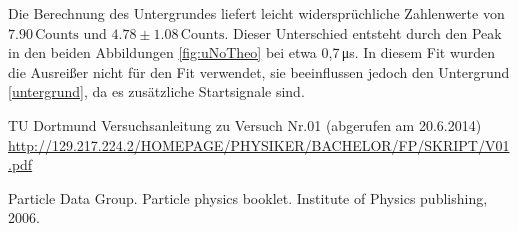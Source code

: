 Die Berechnung des Untergrundes liefert leicht widersprüchliche Zahlenwerte von\\\mbox{$7.90\,\text{Counts}$} und $4.78 \pm 1.08\,\text{Counts}$. Dieser Unterschied entsteht durch den Peak in den beiden Abbildungen \ref{fig:uNoTheo} bei etwa 0,7\,\si{\micro s}. In diesem Fit wurden die Ausreißer nicht für den Fit verwendet, sie beeinflussen jedoch den Untergrund \ref{untergrund}, da es zusätzliche Startsignale sind.

\vfill
\begin{thebibliography}{WissOnl}
 TU Dortmund Versuchsanleitung zu Versuch Nr.01 (abgerufen am 20.6.2014) \url{http://129.217.224.2/HOMEPAGE/PHYSIKER/BACHELOR/FP/SKRIPT/V01.pdf}

 Particle Data Group. Particle physics booklet. Institute of Physics publishing, 2006.

\end{thebibliography}

